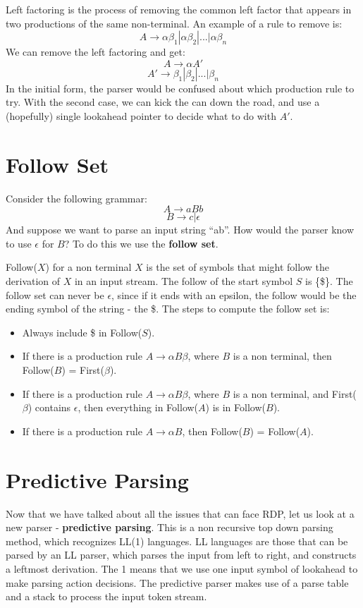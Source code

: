 \documentclass[12pt,letterpaper]{book}
\theoremstyle{definition}
\begin{document}
Left factoring is the process of removing the common left factor that appears in two productions of the same non-terminal. An example of a rule to remove is:
\[A \rightarrow \alpha \beta_1|\alpha \beta_2 | ... | \alpha \beta_n\]
We can remove the left factoring and get:
\[A \rightarrow \alpha A'\]
\[A' \rightarrow \beta_1|\beta_2| ... | \beta_n\]
In the initial form, the parser would be confused about which production rule to try. With the second case, we can kick the can down the road, and use a (hopefully) single lookahead pointer to decide what to do with $A'$.

\section{Follow Set}

Consider the following grammar:
\[A \rightarrow aBb\]
\[B \rightarrow c | \epsilon\]
And suppose we want to parse an input string ``ab''. How would the parser know to use $\epsilon$ for $B$? To do this we use the \textbf{follow set}.

Follow($X$) for a non terminal $X$ is the set of symbols that might follow the derivation of $X$ in an input stream. The follow of the start symbol $S$ is \{\$\}. The follow set can never be $\epsilon$, since if it ends with an epsilon, the follow would be the ending symbol of the string -  the \$. The steps to compute the follow set is:

\begin{itemize}
  \item Always include \$ in Follow($S$).
  \item If there is a production rule $A \rightarrow \alpha B \beta$, where $B$ is a non terminal, then Follow($B$)  = First($\beta$).
  \item If there is a production rule $A \rightarrow \alpha B \beta$, where $B$ is a non terminal, and First($\beta$) contains $\epsilon$, then everything in Follow($A$) is in Follow($B$).
  \item If there is a production rule $A \rightarrow \alpha B$, then Follow($B$) = Follow($A$).
\end{itemize}

\section{Predictive Parsing}

Now that we have talked about all the issues that can face RDP, let us look at a new parser - \textbf{predictive parsing}. This is a non recursive top down parsing method, which recognizes LL(1) languages. LL languages are those that can be parsed by an LL parser, which parses the input from left to right, and constructs a leftmost derivation. The 1 means that we use one input symbol of lookahead to make parsing action decisions. The predictive parser makes use of a parse table and a stack to process the input token stream.
\end{document}
